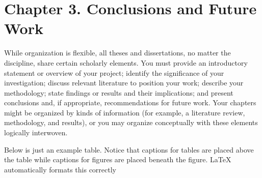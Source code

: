 \chapter{Chapter 3. Conclusions and Future Work}

While organization is flexible, all theses and dissertations, no matter the discipline, share certain scholarly elements. You must provide an introductory statement or overview of your project; identify the significance of your investigation; discuss relevant literature to position your work; describe your methodology; state findings or results and their implications; and present conclusions and, if appropriate, recommendations for future work. Your chapters might be organized by kinds of information (for example, a literature review, methodology, and results), or you may organize conceptually with these elements logically interwoven.

Below is just an example table. Notice that captions for tables are placed above the table while captions for figures are placed beneath the figure. LaTeX automatically formats this correctly
\begin{table}[ht]

\caption[Frequencies for equal-tempered scale, $A_4=440$]{Frequencies for equal-tempered scale, $A_4=440$ Hz. This table shows only the first five notes of a chromatic scale starting on $C_0$} %

\begin{center}
\end{center}


\end{table}

